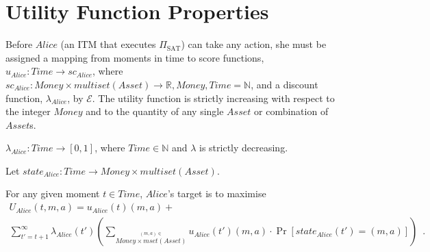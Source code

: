 \section{Utility Function Properties}
  Before $Alice$ (an ITM that executes $\Pi_{\mathrm{SAT}}$) can take any action, she must
  be assigned a mapping from moments in time to score functions, $u_{Alice} : Time
  \rightarrow sc_{Alice}$, where $sc_{Alice} : Money \times multiset\left(Asset\right)
  \rightarrow \mathbb{R}, Money, Time = \mathbb{N}$, and a discount function,
  $\lambda_{Alice}$, by $\mathcal{E}$.
  The utility function is strictly increasing with respect to the integer $Money$ and to
  the quantity of any single $Asset$ or combination of $Asset$s.

  \begin{definition}
    $\lambda_{Alice} : Time \rightarrow \left[0, 1\right]$, where $Time \in \mathbb{N}$
    and $\lambda$ is strictly decreasing.
  \end{definition}
  \begin{definition}[State]
  Let $state_{Alice} : Time \rightarrow Money \times multiset\left(Asset\right)$.
  \end{definition}
  For any given moment $t \in Time$, $Alice$'s target is to maximise
  \begin{gather*}
    U_{Alice}\left(t, m, a\right) = u_{Alice}\left(t\right)\left(m, a\right) + \\
    \sum\limits_{t' = t + 1}^{\infty}
    \lambda_{Alice}\left(t'\right)\left(\sum\limits_{\overset{\left(m, a\right) \in}{Money
    \times mset\left(Asset\right)}} u_{Alice}\left(t'\right)\left(m, a\right) \cdot
    \Pr\left[state_{Alice}\left(t'\right) = \left(m, a\right)\right]\right) \enspace.
  \end{gather*}
